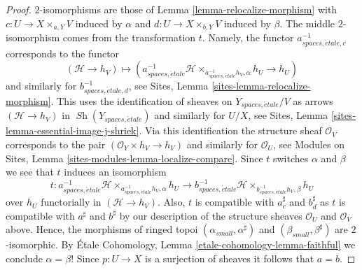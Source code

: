 \documentclass[10pt,a4paper]{amsart}
\theoremstyle{plain}
\theoremstyle{definition}
\theoremstyle{remark}
\numberwithin{equation}{subsection}
\def\Sh{\mathop{\mathit{Sh}}\nolimits}
\def\etale{{\acute{e}tale}}
\begin{document}
\begin{proof}
$2$-isomorphisms are those of
Lemma \ref{lemma-relocalize-morphism}
with $c : U \to X \times_{a, Y} V$ induced by $\alpha$ and
$d : U \to X \times_{b, Y} V$ induced by $\beta$.
The middle $2$-isomorphism comes from the transformation $t$.
Namely, the functor $a_{spaces, \etale, c}^{-1}$ corresponds
to the functor
$$
(\mathcal{H} \to h_V) \longmapsto
(a_{spaces, \etale}^{-1}\mathcal{H}
\times_{a_{spaces, \etale}^{-1}h_V, \alpha}
h_U \to
h_U)
$$
and similarly for $b_{spaces, \etale, d}^{-1}$, see
Sites, Lemma \ref{sites-lemma-relocalize-morphism}.
This uses the identification of sheaves on $Y_{spaces, \etale}/V$
as arrows $(\mathcal{H} \to h_V)$ in $\Sh(Y_{spaces, \etale})$
and similarly for $U/X$, see
Sites, Lemma \ref{sites-lemma-essential-image-j-shriek}.
Via this identification the structure sheaf $\mathcal{O}_V$ corresponds to the
pair $(\mathcal{O}_Y \times h_V \to h_V)$ and similarly
for $\mathcal{O}_U$, see
Modules on Sites,
Lemma \ref{sites-modules-lemma-localize-compare}.
Since $t$ switches $\alpha$ and $\beta$ we see that $t$ induces an isomorphism
$$
t :
a_{spaces, \etale}^{-1}\mathcal{H}
\times_{a_{spaces, \etale}^{-1}h_V, \alpha}
h_U
\longrightarrow
b_{spaces, \etale}^{-1}\mathcal{H}
\times_{b_{spaces, \etale}^{-1}h_V, \beta}
h_U
$$
over $h_U$ functorially in $(\mathcal{H} \to h_V)$. Also, $t$ is compatible
with $a_c^\sharp$ and $b_d^\sharp$ as $t$ is
compatible with $a^\sharp$ and $b^\sharp$ by our description
of the structure sheaves $\mathcal{O}_U$ and $\mathcal{O}_V$
above. Hence, the morphisms of ringed topoi
$(\alpha_{small}, \alpha^\sharp)$ and $(\beta_{small}, \beta^\sharp)$
are $2$-isomorphic. By
\'Etale Cohomology, Lemma \ref{etale-cohomology-lemma-faithful}
we conclude $\alpha = \beta$! Since $p : U \to X$ is a surjection
of sheaves it follows that $a = b$.
\end{proof}
\end{document}
